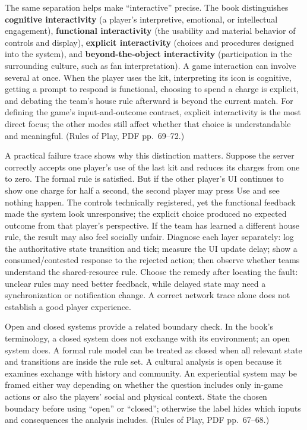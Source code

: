 The same separation helps make ``interactive'' precise. The book distinguishes \textbf{cognitive interactivity} (a player's interpretive, emotional, or intellectual engagement), \textbf{functional interactivity} (the usability and material behavior of controls and display), \textbf{explicit interactivity} (choices and procedures designed into the system), and \textbf{beyond-the-object interactivity} (participation in the surrounding culture, such as fan interpretation). A game interaction can involve several at once. When the player uses the kit, interpreting its icon is cognitive, getting a prompt to respond is functional, choosing to spend a charge is explicit, and debating the team's house rule afterward is beyond the current match. For defining the game's input-and-outcome contract, explicit interactivity is the most direct focus; the other modes still affect whether that choice is understandable and meaningful. (Rules of Play, PDF pp.~69--72.)

A practical failure trace shows why this distinction matters. Suppose the server correctly accepts one player's use of the last kit and reduces its charges from one to zero. The formal rule is satisfied. But if the other player's UI continues to show one charge for half a second, the second player may press Use and see nothing happen. The controls technically registered, yet the functional feedback made the system look unresponsive; the explicit choice produced no expected outcome from that player's perspective. If the team has learned a different house rule, the result may also feel socially unfair. Diagnose each layer separately: log the authoritative state transition and tick; measure the UI update delay; show a consumed/contested response to the rejected action; then observe whether teams understand the shared-resource rule. Choose the remedy after locating the fault: unclear rules may need better feedback, while delayed state may need a synchronization or notification change. A correct network trace alone does not establish a good player experience.

Open and closed systems provide a related boundary check. In the book's terminology, a closed system does not exchange with its environment; an open system does. A formal rule model can be treated as closed when all relevant state and transitions are inside the rule set. A cultural analysis is open because it examines exchange with history and community. An experiential system may be framed either way depending on whether the question includes only in-game actions or also the players' social and physical context. State the chosen boundary before using ``open'' or ``closed''; otherwise the label hides which inputs and consequences the analysis includes. (Rules of Play, PDF pp.~67--68.)

